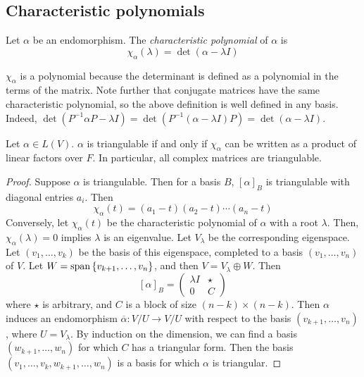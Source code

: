 \subsection{Characteristic polynomials}
\begin{definition}
	Let \( \alpha \) be an endomorphism.
	The \textit{characteristic polynomial} of \( \alpha \) is
	\[
		\chi_\alpha(\lambda) = \det(\alpha - \lambda I)
	\]
\end{definition}
\begin{remark}
	\( \chi_\alpha \) is a polynomial because the determinant is defined as a polynomial in the terms of the matrix.
	Note further that conjugate matrices have the same characteristic polynomial, so the above definition is well defined in any basis.
	Indeed, \( \det(P^{-1}\alpha P - \lambda I) = \det(P^{-1}(\alpha - \lambda I)P) = \det(\alpha - \lambda I) \).
\end{remark}
\begin{theorem}
	Let \( \alpha \in L(V) \).
	\( \alpha \) is triangulable if and only if \( \chi_\alpha \) can be written as a product of linear factors over \( F \).
	In particular, all complex matrices are triangulable.
\end{theorem}
\begin{proof}
	Suppose \( \alpha \) is triangulable.
	Then for a basis \( B \), \( [\alpha]_B \) is triangulable with diagonal entries \( a_i \).
	Then
	\[
		\chi_\alpha(t) = (a_1 - t)(a_2 - t) \cdots (a_n - t)
	\]
	Conversely, let \( \chi_\alpha(t) \) be the characteristic polynomial of \( \alpha \) with a root \( \lambda \).
	Then, \( \chi_\alpha(\lambda) = 0 \) implies \( \lambda \) is an eigenvalue.
	Let \( V_\lambda \) be the corresponding eigenspace.
	Let \( (v_1, \dots, v_k) \) be the basis of this eigenspace, completed to a basis \( (v_1, \dots, v_n) \) of \( V \).
	Let \( W = \operatorname{span}\qty{v_{k+1}, \dots, v_n} \), and then \( V = V_\lambda \oplus W \).
	Then
	\[
		[\alpha]_B = \begin{pmatrix}
			\lambda I & \star \\
			0         & C
		\end{pmatrix}
	\]
	where \( \star \) is arbitrary, and \( C \) is a block of size \( (n-k) \times (n-k) \).
	Then \( \alpha \) induces an endomorphism \( \overline \alpha \colon V/U \to V/U \) with respect to the basis \( (v_{k+1}, \dots, v_n) \), where \( U = V_\lambda \).
	By induction on the dimension, we can find a basis \( (w_{k+1}, \dots, w_n) \) for which \( C \) has a triangular form.
	Then the basis \( (v_1, \dots, v_k, w_{k+1}, \dots, w_n) \) is a basis for which \( \alpha \) is triangular.
\end{proof}
